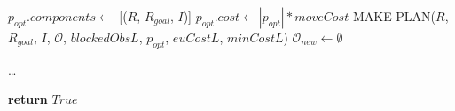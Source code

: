 \begin{algorithm}[H]
\begin{algorithmic}[1]
          \State $p_{opt}.components \gets$ [($R$, $R_{goal}$, $I$)]
          \State $p_{opt}.cost \gets |p_{opt}| * moveCost$
          \State MAKE-PLAN($R$, $R_{goal}$, $I$, $\mathcal{O}$, $blockedObsL$, $p_{opt}$, $euCostL$, $minCostL$)
          \State $\mathcal{O}_{new} \gets \emptyset$
        \EndIf

        \State \dots {}

      \EndWhile

      \State \textbf{return} $True$

    \EndProcedure

  \end{algorithmic}
\end{algorithm}
